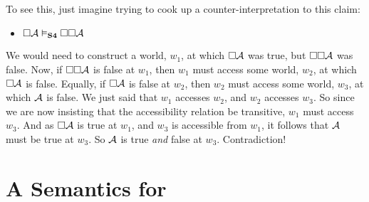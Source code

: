 To see this, just imagine trying to cook up a counter-interpretation to this claim:
\begin{itemize}
	\item[]$\Box\mathcal{A} \vDash_{\mathbf{S4}} \Box \Box \mathcal{A}$
\end{itemize}
We would need to construct a world, $w_1$, at which $\Box\mathcal{A}$ was true, but $\Box \Box \mathcal{A}$ was false. Now, if $\Box \Box \mathcal{A}$ is false at $w_1$, then $w_1$ must access some world, $w_2$, at which $\Box\mathcal{A}$ is false. Equally, if $\Box \mathcal{A}$ is false at $w_2$, then $w_2$ must access some world, $w_3$, at which $\mathcal{A}$ is false. We just said that $w_1$ accesses $w_2$, and $w_2$ accesses $w_3$. So since we are now insisting that the accessibility relation be transitive, $w_1$ must access $w_3$. And as $\Box\mathcal{A}$ is true at $w_1$, and $w_3$ is accessible from $w_1$, it follows that $\mathcal{A}$ must be true at $w_3$. So $\mathcal{A}$ is true \emph{and} false at $w_3$. Contradiction!

\section{A Semantics for \mlSfive}
\label{SemanticsS5}

